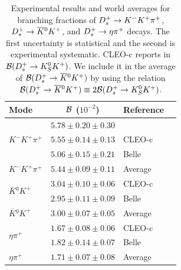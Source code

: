 \begin{table}[t!]
\caption{Experimental results and world averages for branching fractions of $D_{s}^+\to K^-K^+\pi^+$, $D_{s}^+\to \overline{K}{}^0K^+$, and
$D_{s}^+\to \eta\pi^+$ decays. The first uncertainty is statistical and the second is experimental systematic. CLEO-c reports in \cite{Onyisi:2013bjt}
${\cal B}(D_{s}^+\to K^0_SK^+)$. We include it in the average of ${\cal B}(D_{s}^+\to \overline{K}{}^0K^+)$ by using the relation ${\cal B}(D_{s}^+\to \overline{K}{}^0K^+)\equiv 2{\cal B}(D_{s}^+\to K^0_SK^+)$.
\label{tab:DSExpHadronic}}
\begin{center}
\begin{tabular}{lcll}
\toprule
\rowcolor{Gray} Mode 	& ${\cal{B}}$ ($10^{-2}$)				& Reference 	& \\ 
\midrule
\multirow{3}{*}{$K^-K^+\pi^+$}  & $5.78\pm0.20\pm 0.30$ 		& \babar		& \cite{delAmoSanchez:2010jg}\\ 
						& $5.55\pm0.14\pm 0.13$ 		& CLEO-c		& \cite{Onyisi:2013bjt}\\ 
						& $5.06\pm0.15\pm 0.21$ 		& Belle   		& \cite{Zupanc:2013byn}\\
\midrule
\rowcolor{Gray}$K^-K^+\pi^+$	& $5.44\pm0.09\pm 0.11$			& Average & \\
\midrule
\multirow{2}{*}{$\overline{K}{}^0K^+$}		& $3.04\pm0.10\pm 0.06$ 		& CLEO-c		& \cite{Onyisi:2013bjt}\\ 
								& $2.95\pm0.11\pm 0.09$ 		& Belle   		& \cite{Zupanc:2013byn}\\
\midrule
\rowcolor{Gray}$\overline{K}{}^0K^+$		& $3.00\pm0.07\pm 0.05$			& Average & \\
\midrule
\multirow{2}{*}{$\eta\pi^+$}  	& $1.67\pm0.08\pm 0.06$ 		& CLEO-c		& \cite{Onyisi:2013bjt}\\ 
						& $1.82\pm0.14\pm 0.07$ 		& Belle   		& \cite{Zupanc:2013byn}\\
\midrule
\rowcolor{Gray}$\eta\pi^+$	& $1.71\pm0.07\pm 0.08$			& Average & 
\\ \bottomrule
\end{tabular}
\end{center}
\end{table}
